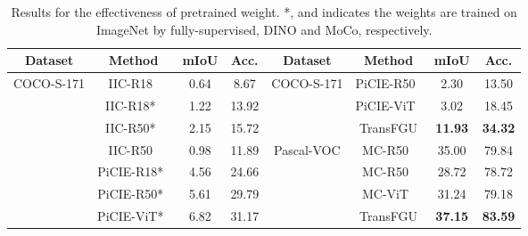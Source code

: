 \documentclass[runningheads]{llncs}
\begin{document}
\begin{table}[h]
    \centering
    \small
    \caption{Results for the effectiveness of pretrained weight. *,  and  indicates the weights are trained on ImageNet by fully-supervised, DINO and MoCo, respectively. \label{tab:fair_comparison}}
    \begin{tabular}{cc|cc|cc|cc}
        \toprule
        {Dataset} & {Method} & {mIoU} & {Acc.} & {Dataset} & {Method} & {mIoU} & {Acc.} \tabularnewline
        \midrule
        \multirow{8}{*}{COCO-S-171} & {IIC-R18~\cite{IIC}}      & 0.64  & 8.67  & \multirow{3}{*}{COCO-S-171}   & PiCIE-R50~\cite{PiCIE}      & 2.30      & 13.50 \tabularnewline
                                    & {IIC-R18*~\cite{IIC}}     & 1.22  & 13.92 &                               & PiCIE-ViT~\cite{PiCIE}      & 3.02      & 18.45 \tabularnewline
                                    & IIC-R50*~\cite{IIC}       & 2.15  & 15.72 &                               & TransFGU                    & \bf 11.93 & \bf 34.32 \tabularnewline
        \cline{5-8}                 & IIC-R50~\cite{IIC}  & 0.98 & 11.89  & \multirow{4}{*}{Pascal-VOC}   & MC-R50~\cite{MaskContrast} & 35.00     & 79.84 \tabularnewline
                                    & PiCIE-R18*~\cite{PiCIE}   & 4.56 & 24.66  &                               & MC-R50~\cite{MaskContrast}  & 28.72     & 78.72\tabularnewline
                                    & PiCIE-R50*~\cite{PiCIE}   & 5.61 & 29.79  &                               & MC-ViT~\cite{MaskContrast}  &  31.24    & 79.18\tabularnewline
                                    & PiCIE-ViT*~\cite{PiCIE}   & 6.82 & 31.17  &                               & TransFGU                    & \bf 37.15 & \bf 83.59 \tabularnewline
        \bottomrule
    \end{tabular}
\end{table}
\end{document}
